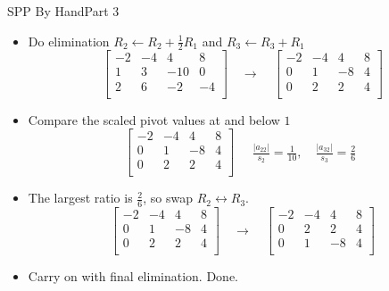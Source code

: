 \documentclass[10pt]{beamer}
\begin{document}
\begin{frame}{SPP By Hand}{Part 3}
\begin{itemize}

    \item Do elimination $R_2 \leftarrow R_2 + \frac{1}{2}R_1$ and $ R_3 \leftarrow R_3 +  R_1$
    \[
    \left[\begin{array}{rrr|r}
    \boxed{-2} & -4 & 4 & 8 \\
    1 & 3 & -10 & 0 \\
    2 & 6 & -2 & -4 \\
    \end{array}\right] \quad \rightarrow \quad 
    \left[\begin{array}{rrr|r}
    \boxed{-2} & -4 & 4 & 8 \\
    0 & 1 & -8 & 4 \\
    0 & 2 & 2 & 4 \\
    \end{array}\right]
    \]

    \item Compare the scaled pivot values at and below $\boxed{1}$
    \[
    \left[\begin{array}{rrr|r}
    -2 & -4 & 4 & 8 \\
    0 & \boxed{1} & -8 & 4 \\
    0 & 2 & 2 & 4 \\
    \end{array}\right]
    \quad \begin{aligned}
    \frac{|a_{22}|}{s_2} = \frac{1}{10}, \quad \frac{|a_{32}|}{s_3} = \frac{2}{6}
    \end{aligned}
    \]
    \item The largest ratio is \( \frac{2}{6} \), so swap \( R_2 \leftrightarrow R_3 \).
    \[
        \left[\begin{array}{rrr|r}
    -2 & -4 & 4 & 8 \\
    0 & \boxed{1} & -8 & 4 \\
    0 & 2 & 2 & 4 \\
    \end{array}\right]
    \quad \rightarrow \quad 
    \left[\begin{array}{rrr|r}
    -2 & -4 & 4 & 8 \\
    0 & \boxed{2} & 2 & 4 \\
    0 & 1 & -8 & 4 \\
    \end{array}\right]
    \]
    \item Carry on with final elimination. Done.
    
    
    
\end{itemize}
\end{frame}
\end{document}
